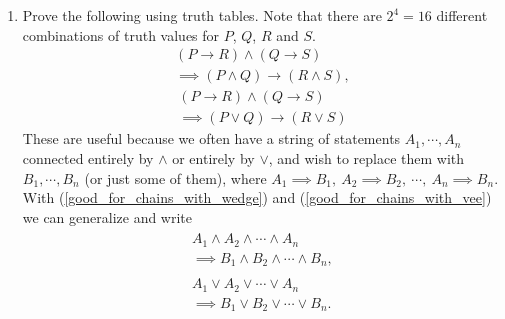 \begin{multicols}{2}
\begin{enumerate}



\item Prove the following using truth tables.
Note that there are $2^4=16$ different combinations
of truth values for $P$, $Q$, $R$ and $S$.
\begin{multline}
(P\longrightarrow R)\wedge(Q\longrightarrow S)
\\ \implies (P\wedge Q)\longrightarrow(R\wedge S)
\label{good_for_chains_with_wedge},\end{multline}
\begin{multline}(P\longrightarrow R)\wedge(Q\longrightarrow S)
\\ \implies (P\vee Q)\longrightarrow(R\vee S)
\label{good_for_chains_with_vee}\end{multline}
These are useful because we often have a string
of statements $A_1,\cdots,A_n$ connected entirely by $\wedge$
or entirely by $\vee$, and wish to replace them 
with $B_1,\cdots,B_n$ (or just some of them), where
$A_1\implies B_1,\ 
A_2\implies B_2,\  \cdots,\ A_n\implies B_n$.\footnotemark
{}  
With (\ref{good_for_chains_with_wedge}) and
(\ref{good_for_chains_with_vee}) we can generalize
and write
\begin{gather}
\begin{split}
A_1\wedge A_2\wedge\cdots\wedge A_n
\\\implies B_1\wedge B_2\wedge\cdots\wedge B_n,
\label{strong_and_strong=>weak_and_weak}\end{split}\\
\begin{split}A_1\vee A_2\vee\cdots\vee A_n
\\ \implies B_1\vee B_2\vee\cdots\vee B_n.
\label{strong_or_strong=>weak_or_weak}\end{split}
\end{gather}


\end{enumerate}
\end{multicols}

